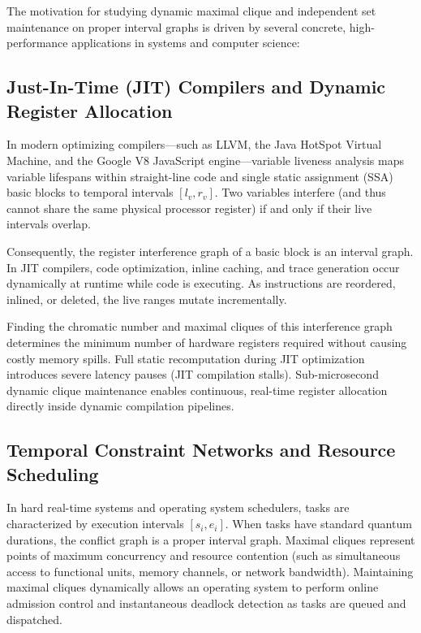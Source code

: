 The motivation for studying dynamic maximal clique and independent set maintenance on proper interval graphs is driven by several concrete, high-performance applications in systems and computer science:

\subsection{Just-In-Time (JIT) Compilers and Dynamic Register Allocation}
In modern optimizing compilers---such as LLVM, the Java HotSpot Virtual Machine, and the Google V8 JavaScript engine---variable liveness analysis maps variable lifespans within straight-line code and single static assignment (SSA) basic blocks to temporal intervals $[l_v, r_v]$. Two variables interfere (and thus cannot share the same physical processor register) if and only if their live intervals overlap. 

Consequently, the register interference graph of a basic block is an interval graph. In JIT compilers, code optimization, inline caching, and trace generation occur dynamically at runtime while code is executing. As instructions are reordered, inlined, or deleted, the live ranges mutate incrementally. 

Finding the chromatic number and maximal cliques of this interference graph determines the minimum number of hardware registers required without causing costly memory spills. Full static recomputation during JIT optimization introduces severe latency pauses (JIT compilation stalls). Sub-microsecond dynamic clique maintenance enables continuous, real-time register allocation directly inside dynamic compilation pipelines.

\subsection{Temporal Constraint Networks and Resource Scheduling}
In hard real-time systems and operating system schedulers, tasks are characterized by execution intervals $[s_i, e_i]$. When tasks have standard quantum durations, the conflict graph is a proper interval graph. Maximal cliques represent points of maximum concurrency and resource contention (such as simultaneous access to functional units, memory channels, or network bandwidth). Maintaining maximal cliques dynamically allows an operating system to perform online admission control and instantaneous deadlock detection as tasks are queued and dispatched.

